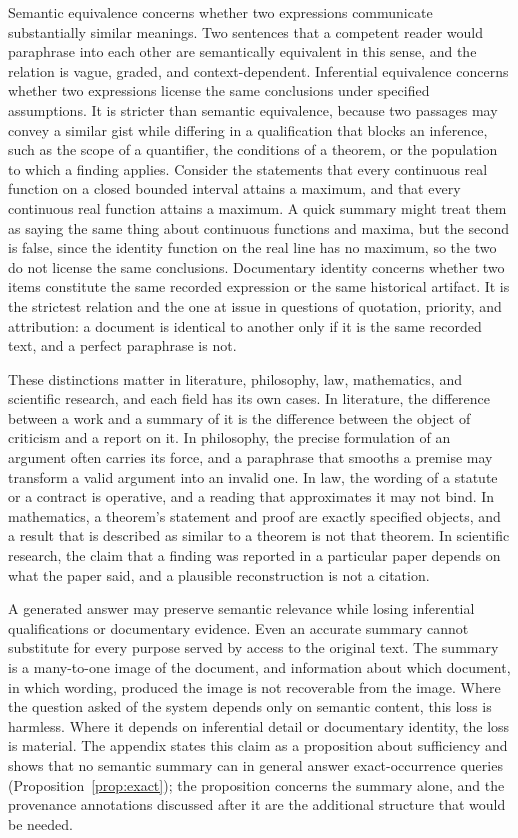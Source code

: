 \documentclass[11pt]{article}
\theoremstyle{remark}
\begin{document}
Semantic equivalence concerns whether two expressions communicate substantially similar meanings. Two sentences that a competent reader would paraphrase into each other are semantically equivalent in this sense, and the relation is vague, graded, and context-dependent. Inferential equivalence concerns whether two expressions license the same conclusions under specified assumptions. It is stricter than semantic equivalence, because two passages may convey a similar gist while differing in a qualification that blocks an inference, such as the scope of a quantifier, the conditions of a theorem, or the population to which a finding applies. Consider the statements that every continuous real function on a closed bounded interval attains a maximum, and that every continuous real function attains a maximum. A quick summary might treat them as saying the same thing about continuous functions and maxima, but the second is false, since the identity function on the real line has no maximum, so the two do not license the same conclusions. Documentary identity concerns whether two items constitute the same recorded expression or the same historical artifact. It is the strictest relation and the one at issue in questions of quotation, priority, and attribution: a document is identical to another only if it is the same recorded text, and a perfect paraphrase is not.

These distinctions matter in literature, philosophy, law, mathematics, and scientific research, and each field has its own cases. In literature, the difference between a work and a summary of it is the difference between the object of criticism and a report on it. In philosophy, the precise formulation of an argument often carries its force, and a paraphrase that smooths a premise may transform a valid argument into an invalid one. In law, the wording of a statute or a contract is operative, and a reading that approximates it may not bind. In mathematics, a theorem's statement and proof are exactly specified objects, and a result that is described as similar to a theorem is not that theorem. In scientific research, the claim that a finding was reported in a particular paper depends on what the paper said, and a plausible reconstruction is not a citation.

A generated answer may preserve semantic relevance while losing inferential qualifications or documentary evidence. Even an accurate summary cannot substitute for every purpose served by access to the original text. The summary is a many-to-one image of the document, and information about which document, in which wording, produced the image is not recoverable from the image. Where the question asked of the system depends only on semantic content, this loss is harmless. Where it depends on inferential detail or documentary identity, the loss is material. The appendix states this claim as a proposition about sufficiency and shows that no semantic summary can in general answer exact-occurrence queries (Proposition~\ref{prop:exact}); the proposition concerns the summary alone, and the provenance annotations discussed after it are the additional structure that would be needed.
\end{document}
